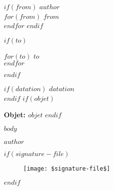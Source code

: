 \documentclass[12pt]{article}
\begin{document}
\pagestyle{empty}

$if(from)$
	\textbf{$author$}\\
	$for(from)$
		$from$\\
	$endfor$
$endif$

$if(to)$
\begin{flushright}
	$for(to)$
		$to$\\
	$endfor$
\end{flushright}
$endif$

$if(datation)$
		$datation$\\
	$endif$
$if(objet)$
  \par\bigskip\textbf{Objet: $objet$}
$endif$

$body$

\bigskip
\begin{flushright}
	$author$
\end{flushright}

$if(signature-file)$
\begin{figure}[h]
  \raggedleft
  \texttt{[image: \$signature-file\$]}
\end{figure}
$endif$
\end{document}
